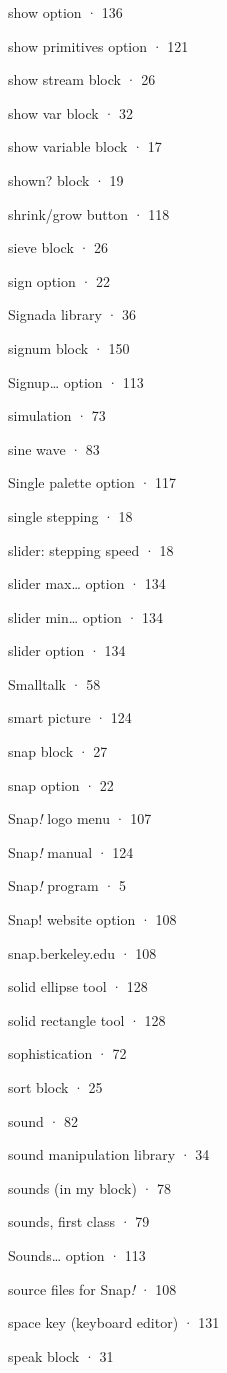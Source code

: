 \documentclass[
  letterpaper,
]{book}
\begin{document}
show option · 136

show primitives option · 121

show stream block · 26

show var block · 32

show variable block · 17

shown? block · 19

shrink/grow button · 118

sieve block · 26

sign option · 22

Signada library · 36

signum block · 150

Signup\ldots{} option · 113

simulation · 73

sine wave · 83

Single palette option · 117

single stepping · 18

slider: stepping speed · 18

slider max\ldots{} option · 134

slider min\ldots{} option · 134

slider option · 134

Smalltalk · 58

smart picture · 124

snap block · 27

snap option · 22

Snap\emph{!} logo menu · 107

Snap\emph{!} manual · 124

Snap\emph{!} program · 5

Snap! website option · 108

snap.berkeley.edu · 108

solid ellipse tool · 128

solid rectangle tool · 128

sophistication · 72

sort block · 25

sound · 82

sound manipulation library · 34

sounds (in my block) · 78

sounds, first class · 79

Sounds\ldots{} option · 113

source files for Snap\emph{!} · 108

space key (keyboard editor) · 131

speak block · 31
\end{document}

